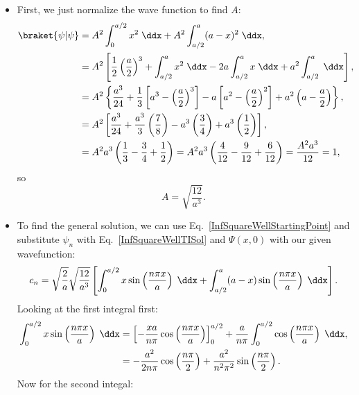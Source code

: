 \begin{example}
    \begin{itemize}
        \item First, we just normalize the wave function to find $A$:
            \begin{align*}
                \braket{\psi | \psi} &= A^2 \int_0^{a/2} x^2 \;\ddx + A^2 \int_{a/2}^a (a-x)^2 \;\ddx, \\
                &= A^2 \left[ \frac{1}{2}\left(\frac{a}{2}\right)^3 + \int_{a/2}^a x^2\;\ddx - 2a\int_{a/2}^a x\;\ddx + a^2 \int_{a/2}^a \;\ddx \right], \\
                &= A^2 \left\{ \frac{a^3}{24} + \frac{1}{3}\left[a^3 - \left(\frac{a}{2}\right)^3\right] - a\left[a^2 - \left(\frac{a}{2}\right)^2\right] + a^2 \left(a - \frac{a}{2}\right) \right\}, \\
                &= A^2 \left[\frac{a^3}{24} + \frac{a^3}{3}\left(\frac{7}{8}\right) - a^3 \left(\frac{3}{4}\right) + a^3 \left(\frac{1}{2}\right)\right], \\
                &= A^2a^3 \left(\frac{1}{3} - \frac{3}{4} + \frac{1}{2}\right) = A^2a^3 \left(\frac{4}{12} - \frac{9}{12} + \frac{6}{12}\right) = \frac{A^2a^3}{12} = 1,
            \end{align*}
            so
            \begin{equation*}
                \boxed{A = \sqrt{\frac{12}{a^3}}.}
            \end{equation*}
        \item To find the general solution, we can use Eq.~\eqref{InfSquareWellStartingPoint} and substitute $\psi_n$ with Eq.~\eqref{InfSquareWellTISol} and $\Psi(x,0)$ with our given wavefunction:
            \begin{equation*}
                c_n = \sqrt{\frac{2}{a}}\sqrt{\frac{12}{a^3}} \left[\int_0^{a/2} x\sin\left(\frac{n\pi x}{a}\right)\;\ddx + \int_{a/2}^a (a-x)\sin\left(\frac{n\pi x}{a}\right) \;\ddx\right].
            \end{equation*}
            Looking at the first integral first:
            \begin{align*}
                \int_0^{a/2} x\sin\left(\frac{n\pi x}{a}\right)\;\ddx &= \left[-\frac{xa}{n\pi}\cos\left(\frac{n\pi x}{a}\right)\right]_0^{a/2} + \frac{a}{n\pi}\int_0^{a/2} \cos\left(\frac{n\pi x}{a}\right) \;\ddx, \\
                &= -\frac{a^2}{2n\pi}\cos\left(\frac{n\pi}{2}\right) + \frac{a^2}{n^2\pi^2}\sin\left(\frac{n\pi}{2}\right).
            \end{align*}
            Now for the second integal:

\end{itemize}
\end{example}
